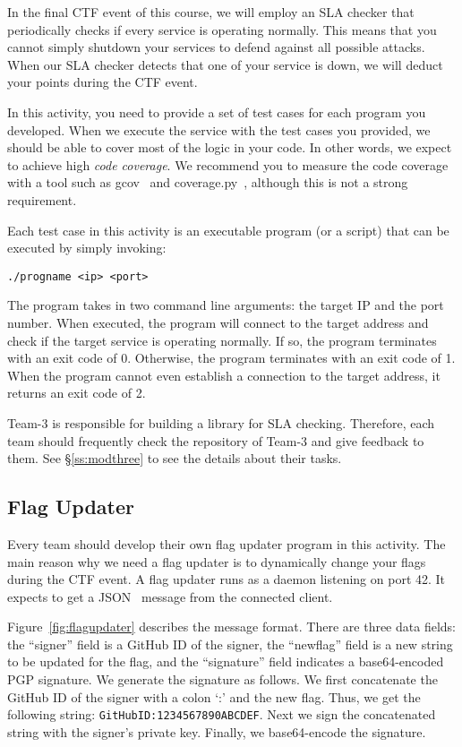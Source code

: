 \documentclass[a4paper, 11pt]{article}
\theoremstyle{definition}
\begin{document}
{In the final CTF event of this course, we will employ an SLA checker
that periodically checks if every service is operating normally. This
means that you cannot simply shutdown your services to defend against
all possible attacks. When our SLA checker detects that one of your
service is down, we will deduct your points during the CTF event.

In this activity, you need to provide a set of test cases for each
program you developed. When we execute the service with the test cases
you provided, we should be able to cover most of the logic in your
code. In other words, we expect to achieve high \emph{code coverage}.
We recommend you to measure the code coverage with a tool such as
gcov~\cite{gcov} and coverage.py~\cite{pycov}, although this is not a
strong requirement.

Each test case in this activity is an executable program (or a script)
that can be executed by simply invoking:
\begin{verbatim}
./progname <ip> <port>
\end{verbatim}
The program takes in two command line arguments: the target IP and the
port number. When executed, the program will connect to the target
address and check if the target service is operating normally. If so,
the program terminates with an exit code of 0. Otherwise, the program
terminates with an exit code of 1. When the program cannot even
establish a connection to the target address, it returns an exit code
of 2.

Team-3 is responsible for building a library for SLA checking.
Therefore, each team should frequently check the repository of Team-3
and give feedback to them. See \S\ref{ss:modthree} to see the details
about their tasks.

\subsection{Flag Updater} \label{ss:flagupdater}

Every team should develop their own flag updater program in this
activity. The main reason why we need a flag updater is to dynamically
change your flags during the CTF event. A flag updater runs as a
daemon listening on port 42. It expects to get a JSON~\cite{json}
message from the connected client.

Figure~\ref{fig:flagupdater} describes the message format. There are
three data fields: the ``signer'' field is a GitHub ID of the signer,
the ``newflag'' field is a new string to be updated for the flag, and
the ``signature'' field indicates a base64-encoded PGP signature. We
generate the signature as follows. We first concatenate the GitHub ID
of the signer with a colon `:' and the new flag. Thus, we get the
following string: \texttt{GitHubID:1234567890ABCDEF}. Next we sign the
concatenated string with the signer's private key. Finally, we
base64-encode the signature.

}
\end{document}
